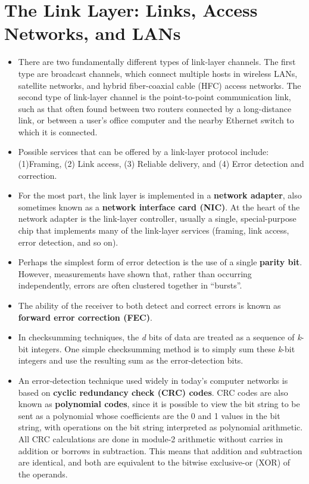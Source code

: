 \section{The Link Layer: Links, Access Networks, and LANs}
\begin{itemize}

\item
There are two fundamentally different types of link-layer channels. The first type are broadcast channels, which connect multiple hosts in wireless LANs, satellite networks, and hybrid fiber-coaxial cable (HFC) access networks. The second type of link-layer channel is the point-to-point communication link, such as that often found between two routers connected by a long-distance link, or between a user's office computer and the nearby Ethernet switch to which it is connected.

\item
Possible services that can be offered by a link-layer protocol include: (1)Framing, (2) Link access, (3) Reliable delivery, and (4) Error detection and correction.

\item
For the most part, the link layer is implemented in a \textbf{network adapter}, also sometimes known as a \textbf{network interface card (NIC)}. At the heart of the network adapter is the link-layer controller, usually a single, special-purpose chip that implements many of the link-layer services (framing, link access, error detection, and so on).

\item
Perhaps the simplest form of error detection is the use of a single \textbf{parity bit}.\\
However, measurements have shown that, rather than occurring independently, errors are often clustered together in ``bursts''.

\item
The ability of the receiver to both detect and correct errors is known as \textbf{forward error correction (FEC)}.

\item
In checksumming techniques, the \textit{d} bits of data are treated as a sequence of \textit{k}-bit integers. One simple checksumming method is to simply sum these \textit{k}-bit integers and use the resulting sum as the error-detection bits.

\item
An error-detection technique used widely in today's computer networks is based on \textbf{cyclic redundancy check (CRC) codes}. CRC codes are also known as \textbf{polynomial codes}, since it is possible to view the bit string to be sent as a polynomial whose coefficients are the 0 and 1 values in the bit string, with operations on the bit string interpreted as polynomial arithmetic.\\
All CRC calculations are done in module-2 arithmetic without carries in addition or borrows in subtraction. This means that addition and subtraction are identical, and both are equivalent to the bitwise exclusive-or (XOR) of the operands.


\end{itemize}
